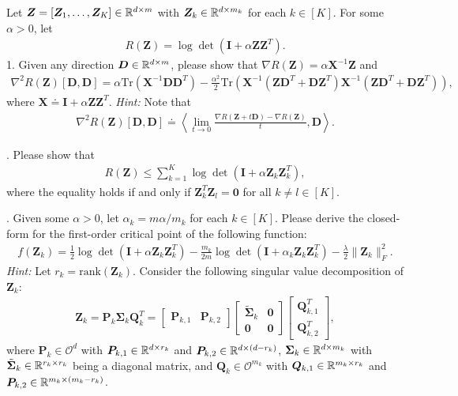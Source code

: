 \documentclass[../../book-main.tex]{subfiles}
\begin{document}
\begin{exercise}
    Let $\bm Z = [\bm Z_1,\dots,\bm Z_K] \in \mathbb{R}^{d\times m}$ with $\bm Z_k \in \mathbb{R}^{d\times m_k}$ for each $k \in [K]$. For some $\alpha > 0$, let 
    \begin{align*}
        R(\bm Z) = \log\det\left(\bm I + \alpha\bm Z\bm Z^T \right).
    \end{align*}
1. Given any direction $\bm D \in \mathbb{R}^{d\times m}$, please show that $\nabla R(\bm Z) = \alpha\bm X^{-1}\bm Z$ and 
    \begin{align*}
 \nabla^2 R(\bm Z)[\bm D, \bm D] =\alpha \mathrm{Tr}\left( \bm X^{-1}\bm D\bm D^T\right) - \frac{\alpha^2}{2}\mathrm{Tr}\left(\bm X^{-1}\left( \bm Z\bm D^T+\bm D\bm Z^T\right) \bm X^{-1}\left( \bm Z\bm D^T+\bm D\bm Z^T\right)\right),
    \end{align*}
    where $\bm X \doteq \bm I + \alpha\bm Z\bm Z^T$. {\em Hint:} Note that
    \begin{align*}
        \nabla^2 R(\bm Z)[\bm D, \bm D] \doteq \left\langle \lim_{t \to 0} \frac{\nabla R(\bm Z+ t\bm D) - \nabla R(\bm Z)}{t}, \bm D \right\rangle. 
    \end{align*}

. Please show that 
\begin{align*}
    R(\bm Z) \le \sum_{k=1}^K \log\det\left(\bm I + \alpha\bm Z_k\bm Z_k^T \right),
\end{align*}
where the equality holds if and only if $\bm Z_k^T\bm Z_l = \bm 0$ for all $k \neq l \in [K]$. 
\medskip 

. Given some $\alpha >0$, let $\alpha_k=m\alpha/m_k$ for each $k \in [K]$. Please derive the closed-form for the first-order critical point of the following function: 
\begin{align*}
    f(\bm Z_k) = \frac{1}{2}\log\det\left(\bm I + \alpha\bm Z_k\bm Z_k^T \right) - \frac{m_k}{2m}\log\det\left(\bm I + \alpha_k \bm Z_k\bm Z_k^T \right) - \frac{\lambda}{2}\|\bm Z_k\|_F^2. 
\end{align*}
{\em Hint:} Let $r_k=\mathrm{rank}(\bm Z_k)$. Consider the following singular value decomposition of $\bm Z_k$: 
\begin{align*}
    \bm Z_k = \bm P_k\bm \Sigma_k\bm Q_k^T = \begin{bmatrix}
        \bm P_{k,1} & \bm P_{k,2}
    \end{bmatrix} \begin{bmatrix}
        \tilde{\bm \Sigma}_{k} & \bm 0 \\
        \bm 0 & \bm 0
    \end{bmatrix} 
    \begin{bmatrix}
        \bm Q_{k,1}^T \\ \bm Q_{k,2}^T
    \end{bmatrix}, 
\end{align*}
where $\bm P_k \in \mathcal{O}^d$ with $\bm P_{k,1} \in \mathbb{R}^{d\times r_k}$ and  $\bm P_{k,2} \in \mathbb{R}^{d\times (d-r_k)}$, $\bm \Sigma_k \in \mathbb{R}^{d\times m_k}$ with $\tilde{\bm \Sigma}_{k} \in \mathbb{R}^{r_k\times r_k}$ being a diagonal matrix, and  $\bm Q_k \in \mathcal{O}^{m_k}$ with $\bm Q_{k,1} \in \mathbb{R}^{m_k\times r_k}$ and  $\bm P_{k,2} \in \mathbb{R}^{m_k \times (m_k-r_k)}$. 
\medskip 


\end{exercise}
\end{document}
